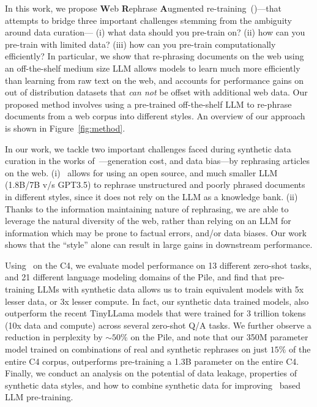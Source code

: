 In this work, we propose \textbf{W}eb \textbf{R}ephrase \textbf{A}ugmented re-training~(\ours)---that attempts to bridge
three important challenges stemming from the ambiguity around data curation---
(i) what data should you pre-train on?
(ii) how can you pre-train with limited data?
(iii) how can you pre-train computationally efficiently?
In particular, we show that re-phrasing documents on the web using an off-the-shelf medium size LLM allows models to learn much more efficiently than learning from raw text on the web, and 
accounts for 
performance gains on out of distribution datasets that \emph{can not} be offset with additional web data. Our proposed method involves using a pre-trained off-the-shelf LLM to re-phrase documents from a web corpus into different styles.  An overview of our approach is shown in Figure~\ref{fig:method}.




In our work, we tackle two important challenges faced during synthetic data curation in the works of~\citet{gunasekar2023textbooks}---generation cost, and data bias---by rephrasing articles on the web. (i) \ours~allows for using an open source, and much smaller LLM (1.8B/7B v/s GPT3.5) to rephrase unstructured and poorly phrased documents in different styles, since it does not rely on the LLM as a knowledge bank. (ii) Thanks to the information maintaining nature of rephrasing, we are able to leverage the natural diversity of the web, rather than relying on an LLM for information which may be prone to factual errors, and/or data biases. Our work shows that the ``style'' alone can result in large gains in downstream performance.

Using \ours~on the C4, we evaluate model performance on 13 different zero-shot tasks, and 21 different language modeling domains of the Pile,  and find that pre-training LLMs with synthetic data allows us to train equivalent models with 5x lesser data, or 3x lesser compute. In fact, our synthetic data trained models, also outperform the recent TinyLLama models that were trained for 3 trillion tokens (10x data and compute) across several zero-shot Q/A tasks. 
We further observe 
a reduction in perplexity by $\sim50\%$ on the Pile,
and note that our 350M parameter model trained on combinations of real and synthetic rephrases on just $15\%$ of the entire C4 corpus,  outperforms pre-training a 1.3B parameter on the entire C4.
Finally, we conduct an analysis on the 
potential of data leakage, 
properties of synthetic data styles, and how to combine synthetic data for improving  \ours~based LLM pre-training.
